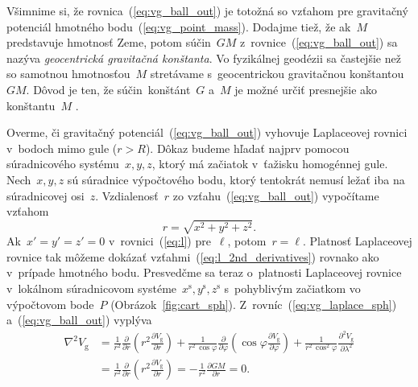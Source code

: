 \documentclass[a4paper, 12pt]{book}
\newcommand{\gidx}{\mathrm g}
\begin{document}
Všimnime si, že rovnica~(\ref{eq:vg_ball_out}) je totožná so vzťahom pre 
gravitačný potenciál hmotného bodu~(\ref{eq:vg_point_mass}).  Dodajme tiež, že 
ak~$M$ predstavuje hmotnosť Zeme, potom súčin~$GM$ 
z~rovnice~(\ref{eq:vg_ball_out}) sa nazýva \emph{geocentrická gravitačná 
konštanta}.  Vo fyzikálnej geodézii sa častejšie než so samotnou hmotnosťou~$M$ 
stretávame s~geocentrickou gravitačnou konštantou~$GM$.  Dôvod je ten, že 
súčin~konštánt~$G$ a~$M$ je možné určiť presnejšie ako konštantu~$M$ 
\parencite{Pick2000}.

Overme, či gravitačný potenciál~(\ref{eq:vg_ball_out}) vyhovuje Laplaceovej 
rovnici v~bodoch mimo gule ($r > R$).  Dôkaz budeme hľadať najprv pomocou 
súradnicového systému~$x, y, z$, ktorý má začiatok v~ťažisku homogénnej gule.  
Nech~$x, y, z$ sú súradnice výpočtového bodu, ktorý tentokrát nemusí ležať iba 
na súradnicovej osi~$z$.  Vzdialenosť~$r$ zo vzťahu~(\ref{eq:vg_ball_out}) 
vypočítame vzťahom
%
\begin{equation}
\label{eq:spherical_radius}
r = \sqrt{x^2 + y^2 + z^2}.
\end{equation}
%
Ak~$x' = y' = z' = 0$ v~rovnici~(\ref{eq:l}) pre~$\ell$, potom~$r = \ell$.  
Platnosť Laplaceovej rovnice tak môžeme dokázať 
vzťahmi~(\ref{eq:l_2nd_derivatives}) rovnako ako v~prípade hmotného bodu.  
Presvedčme sa teraz o~platnosti Laplaceovej rovnice v~lokálnom súradnicovom 
systéme~$x^\mathrm{s}, y^\mathrm{s}, z^\mathrm{s}$ s~pohyblivým začiatkom vo 
výpočtovom bode~$P$ (Obrázok~\ref{fig:cart_sph}).  
Z~rovníc~(\ref{eq:vg_laplace_sph}) a~(\ref{eq:vg_ball_out}) vyplýva
%
\begin{equation}
\begin{split}
\nabla^2 V_\gidx &= \frac{1}{r^2} \frac{\partial}{\partial r} \left( r^2 
\frac{\partial V_\gidx}{\partial r} \right) + \frac{1}{r^2 \, \cos\varphi} 
\frac{\partial}{\partial \varphi} \left( \cos\varphi \frac{\partial 
V_\gidx}{\partial \varphi} \right) + \frac{1}{r^2 \, 
\cos^2\varphi}\frac{\partial^2 V_\gidx}{\partial \lambda^2}\\
%
&= \frac{1}{r^2} \frac{\partial}{\partial r} \left( r^2 \frac{\partial 
V_\gidx}{\partial r} \right) = -\frac{1}{r^2} \frac{\partial GM}{\partial r} 
= 0{.}
\end{split}
\end{equation}
\end{document}
